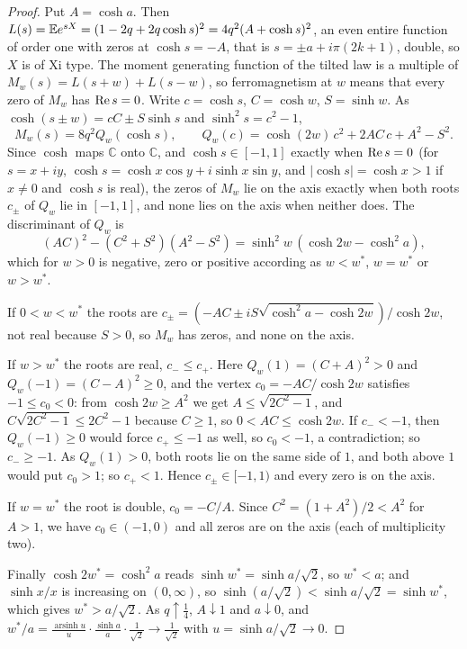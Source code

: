 \begin{proof}
Put $A=\cosh a$. Then $L(s)=\mathbb{E} e^{sX}=(1-2q+2q\cosh s)^2=4q^2(A+\cosh s)^2$, an even entire function of order one with zeros at $\cosh s=-A$, that is $s=\pm a+i\pi(2k+1)$, double, so $X$ is of Xi type. The moment generating function of the tilted law is a multiple of $M_w(s)=L(s+w)+L(s-w)$, so ferromagnetism at $w$ means that every zero of $M_w$ has $\operatorname{Re} s=0$. Write $c=\cosh s$, $C=\cosh w$, $S=\sinh w$. As $\cosh(s\pm w)=cC\pm S\sinh s$ and $\sinh^2s=c^2-1$,
\[
M_w(s)=8q^2Q_w(\cosh s),\qquad Q_w(c)=\cosh(2w)\,c^2+2AC\,c+A^2-S^2 .
\]
Since $\cosh$ maps $\mathbb C$ onto $\mathbb C$, and $\cosh s\in[-1,1]$ exactly when $\operatorname{Re} s=0$ (for $s=x+iy$, $\cosh s=\cosh x\cos y+i\sinh x\sin y$, and $|\cosh s|=\cosh x>1$ if $x\ne0$ and $\cosh s$ is real), the zeros of $M_w$ lie on the axis exactly when both roots $c_\pm$ of $Q_w$ lie in $[-1,1]$, and none lies on the axis when neither does. The discriminant of $Q_w$ is
\[
(AC)^2-(C^2+S^2)(A^2-S^2)=\sinh^2w\,(\cosh2w-\cosh^2a),
\]
which for $w>0$ is negative, zero or positive according as $w<w^*$, $w=w^*$ or $w>w^*$.

If $0<w<w^*$ the roots are $c_\pm=(-AC\pm iS\sqrt{\cosh^2a-\cosh2w})/\cosh2w$, not real because $S>0$, so $M_w$ has zeros, and none on the axis.

If $w>w^*$ the roots are real, $c_-\le c_+$. Here $Q_w(1)=(C+A)^2>0$ and $Q_w(-1)=(C-A)^2\ge0$, and the vertex $c_0=-AC/\cosh2w$ satisfies $-1\le c_0<0$: from $\cosh 2w\ge A^2$ we get $A\le\sqrt{2C^2-1}$, and $C\sqrt{2C^2-1}\le2C^2-1$ because $C\ge1$, so $0<AC\le\cosh 2w$. If $c_-<-1$, then $Q_w(-1)\ge0$ would force $c_+\le-1$ as well, so $c_0<-1$, a contradiction; so $c_-\ge-1$. As $Q_w(1)>0$, both roots lie on the same side of $1$, and both above $1$ would put $c_0>1$; so $c_+<1$. Hence $c_\pm\in[-1,1)$ and every zero is on the axis.

If $w=w^*$ the root is double, $c_0=-C/A$. Since $C^2=(1+A^2)/2<A^2$ for $A>1$, we have $c_0\in(-1,0)$ and all zeros are on the axis (each of multiplicity two).

Finally $\cosh 2w^*=\cosh^2a$ reads $\sinh w^*=\sinh a/\sqrt2$, so $w^*<a$; and $\sinh x/x$ is increasing on $(0,\infty)$, so $\sinh(a/\sqrt2)<\sinh a/\sqrt2=\sinh w^*$, which gives $w^*>a/\sqrt2$. As $q\uparrow\frac14$, $A\downarrow1$ and $a\downarrow0$, and $w^*/a=\frac{\operatorname{arsinh}u}{u}\cdot\frac{\sinh a}{a}\cdot\frac1{\sqrt2}\to\frac1{\sqrt2}$ with $u=\sinh a/\sqrt2\to 0$.
\end{proof}

